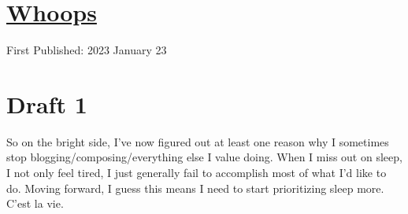 \documentclass[12pt]{article}[titlepage]
\newcommand{\1}{\={a}}
\newcommand{\2}{\={e}}
\newcommand{\3}{\={\i}}
\newcommand{\4}{\=o}
\newcommand{\5}{\=u}
\newcommand{\6}{\={A}}
\renewcommand{\,}{\textsuperscript{,}}
\begin{document}
\doublespacing
\section{\href{whoops-5.html}{Whoops}}
First Published: 2023 January 23

\section{Draft 1}
So on the bright side, I've now figured out at least one reason why I sometimes stop blogging/composing/everything else I value doing.
When I miss out on sleep, I not only feel tired, I just generally fail to accomplish most of what I'd like to do.
Moving forward, I guess this means I need to start prioritizing sleep more.
C'est la vie.
\end{document}

